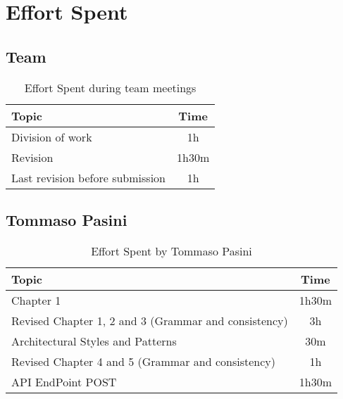 \chapter{Effort Spent}

\section*{Team}


\begin{table}[H]
    \renewcommand{\arraystretch}{1.5}
    \centering
    \begin{tabular}{|l|c|}
        \hline
        \textbf{Topic}                  & \textbf{Time} \\ \hline
        Division of work                & 1h            \\ \hline
        Revision                        & 1h30m         \\ \hline
        Last revision before submission & 1h            \\ \hline
    \end{tabular}
    \caption{Effort Spent during team meetings}
    \label{tab:group-effort-spent}
\end{table}

\section*{Tommaso Pasini}
\begin{table}[H]
    \renewcommand{\arraystretch}{1.5}
    \centering
    \begin{tabular}{|l|c|}
        \hline
        \textbf{Topic}                                       & \textbf{Time} \\ \hline
        Chapter 1                                            & 1h30m         \\ \hline
        Revised Chapter 1, 2 and 3 (Grammar and consistency) & 3h            \\ \hline
        Architectural Styles and Patterns                    & 30m           \\ \hline
        Revised Chapter 4 and 5 (Grammar and consistency)    & 1h            \\ \hline
        API EndPoint POST                                    & 1h30m         \\ \hline
    \end{tabular}
    \caption{Effort Spent by Tommaso Pasini}
    \label{tab:pasini-effort-spent}
\end{table}

